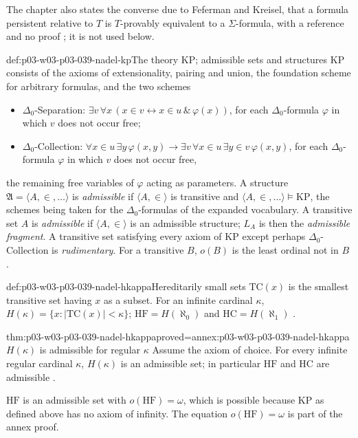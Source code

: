 The chapter also states the converse due to Feferman and Kreisel, that a
formula persistent relative to \(T\) is \(T\)-provably equivalent to a
\(\Sigma\)-formula, with a reference and no proof
\cite[p.~289]{Nadel1985Admissible}; it is not used below.

\begin{hbdefinition}{def:p03-w03-p03-039-nadel-kp}{The theory \(\mathrm{KP}\); admissible sets and structures}
\(\mathrm{KP}\) consists of the axioms of extensionality, pairing and union,
the foundation scheme for arbitrary formulas, and the two schemes
\begin{itemize}
\item \(\Delta_0\)-Separation:
      \(\exists v\,\forall x\,(x\in v\leftrightarrow x\in u\,\&\,\varphi(x))\),
      for each \(\Delta_0\)-formula \(\varphi\) in which \(v\) does not
      occur free;
\item \(\Delta_0\)-Collection:
      \(\forall x\in u\,\exists y\,\varphi(x,y)\to\exists v\,\forall x\in u\,\exists y\in v\,\varphi(x,y)\),
      for each \(\Delta_0\)-formula \(\varphi\) in which \(v\) does not
      occur free,
\end{itemize}
the remaining free variables of \(\varphi\) acting as parameters. A
structure \(\mathfrak A=\langle A,\in,\dots\rangle\) is \emph{admissible} if
\(\langle A,\in\rangle\) is transitive and
\(\langle A,\in,\dots\rangle\models\mathrm{KP}\), the schemes being taken for
the \(\Delta_0\)-formulas of the expanded vocabulary. A transitive set \(A\)
is \emph{admissible} if \(\langle A,\in\rangle\) is an admissible structure;
\(L_A\) is then the \emph{admissible fragment}. A transitive set satisfying
every axiom of \(\mathrm{KP}\) except perhaps \(\Delta_0\)-Collection is
\emph{rudimentary}. For a transitive \(B\), \(o(B)\) is the least ordinal not
in \(B\) \cite[pp.~289--290]{Nadel1985Admissible}.
\end{hbdefinition}

\begin{hbdefinition}{def:p03-w03-p03-039-nadel-hkappa}{Hereditarily small sets}
\(\mathrm{TC}(x)\) is the smallest transitive set having \(x\) as a subset.
For an infinite cardinal \(\kappa\),
\(H(\kappa)=\{x:\lvert\mathrm{TC}(x)\rvert<\kappa\}\);
\(\mathrm{HF}=H(\aleph_0)\) and \(\mathrm{HC}=H(\aleph_1)\)
\cite[p.~290]{Nadel1985Admissible}.
\end{hbdefinition}

\begin{hbtheorem}{thm:p03-w03-p03-039-nadel-hkappa}{proved=annex:p03-w03-p03-039-nadel-hkappa}{\(H(\kappa)\) is admissible for regular \(\kappa\)}
Assume the axiom of choice. For every infinite regular cardinal \(\kappa\),
\(H(\kappa)\) is an admissible set; in particular \(\mathrm{HF}\) and
\(\mathrm{HC}\) are admissible \cite[p.~290]{Nadel1985Admissible}.
\end{hbtheorem}

\(\mathrm{HF}\) is an admissible set with \(o(\mathrm{HF})=\omega\), which is
possible because \(\mathrm{KP}\) as defined above has no axiom of infinity.
The equation \(o(\mathrm{HF})=\omega\) is part of the annex proof.
